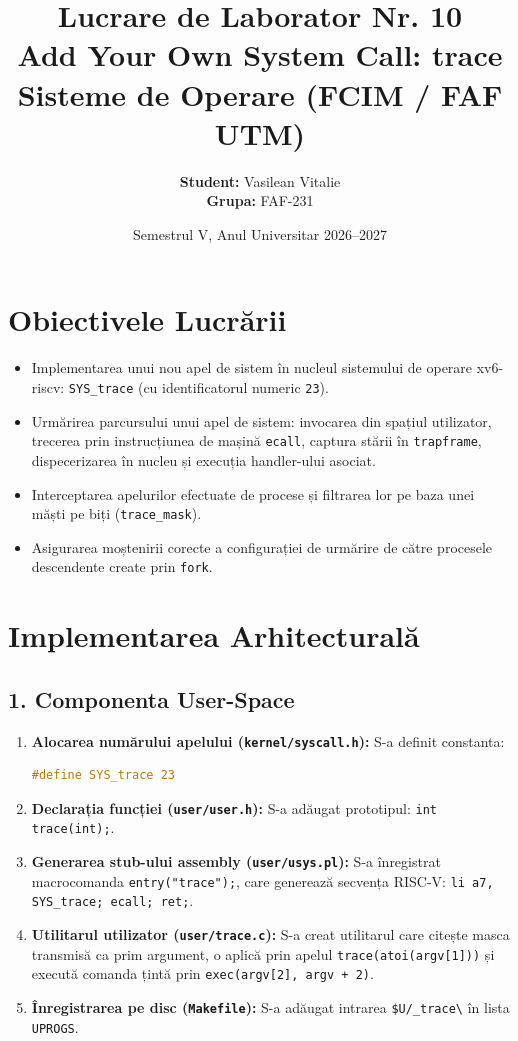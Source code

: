 \documentclass[12pt,a4paper]{article}
\title{\textbf{Lucrare de Laborator Nr. 10}\\ \large Add Your Own System Call: trace\\ \small Sisteme de Operare (FCIM / FAF UTM)}
\author{\textbf{Student:} Vasilean Vitalie \\ \textbf{Grupa:} FAF-231}
\date{Semestrul V, Anul Universitar 2026--2027}
\begin{document}
\maketitle

\section{Obiectivele Lucrării}
\begin{itemize}
    \item Implementarea unui nou apel de sistem în nucleul sistemului de operare xv6-riscv: \texttt{SYS\_trace} (cu identificatorul numeric \texttt{23}).
    \item Urmărirea parcursului unui apel de sistem: invocarea din spațiul utilizator, trecerea prin instrucțiunea de mașină \texttt{ecall}, captura stării în \texttt{trapframe}, dispecerizarea în nucleu și execuția handler-ului asociat.
    \item Interceptarea apelurilor efectuate de procese și filtrarea lor pe baza unei măști pe biți (\texttt{trace\_mask}).
    \item Asigurarea moștenirii corecte a configurației de urmărire de către procesele descendente create prin \texttt{fork}.
\end{itemize}

\section{Implementarea Arhitecturală}

\subsection{1. Componenta User-Space}
\begin{enumerate}
    \item \textbf{Alocarea numărului apelului (\texttt{kernel/syscall.h}):}  
    S-a definit constanta:
    \begin{lstlisting}[language=C]
#define SYS_trace 23
    \end{lstlisting}
    \item \textbf{Declarația funcției (\texttt{user/user.h}):}  
    S-a adăugat prototipul: \texttt{int trace(int);}.
    \item \textbf{Generarea stub-ului assembly (\texttt{user/usys.pl}):}  
    S-a înregistrat macrocomanda \texttt{entry("trace");}, care generează secvența RISC-V: \texttt{li a7, SYS\_trace; ecall; ret;}.
    \item \textbf{Utilitarul utilizator (\texttt{user/trace.c}):}  
    S-a creat utilitarul care citește masca transmisă ca prim argument, o aplică prin apelul \texttt{trace(atoi(argv[1]))} și execută comanda țintă prin \texttt{exec(argv[2], argv + 2)}.
    \item \textbf{Înregistrarea pe disc (\texttt{Makefile}):}  
    S-a adăugat intrarea \texttt{\$U/\_trace\textbackslash} în lista \texttt{UPROGS}.
\end{enumerate}
\end{document}
